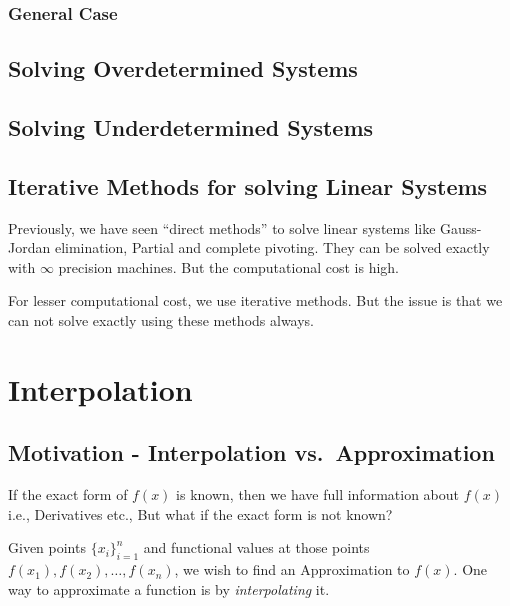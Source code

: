 \documentclass[
]{book}
\begin{document}
\hypertarget{general-case}{%
\subsection{General Case}\label{general-case}}

\hypertarget{solving-overdetermined-systems}{%
\section{Solving Overdetermined Systems}\label{solving-overdetermined-systems}}

\hypertarget{solving-underdetermined-systems}{%
\section{Solving Underdetermined Systems}\label{solving-underdetermined-systems}}

\hypertarget{iterative-methods-for-solving-linear-systems}{%
\section{Iterative Methods for solving Linear Systems}\label{iterative-methods-for-solving-linear-systems}}

Previously, we have seen ``direct methods'' to solve linear systems like Gauss-Jordan elimination, Partial and complete pivoting. They can be solved exactly with \(\infty\) precision machines. But the computational cost is high.

For lesser computational cost, we use iterative methods. But the issue is that we can not solve exactly using these methods always.

\hypertarget{interpolation}{%
\chapter{Interpolation}\label{interpolation}}

\hypertarget{motivation---interpolation-vs.-approximation}{%
\section{Motivation - Interpolation vs.~Approximation}\label{motivation---interpolation-vs.-approximation}}

If the exact form of \(f(x)\) is known, then we have full information about \(f(x)\) i.e., Derivatives etc., But what if the exact form is not known?

Given points \(\{x_i\}_{i=1}^n\) and functional values at those points \(f(x_1),f(x_2), \dots, f(x_n)\), we wish to find an Approximation to \(f(x)\). One way to approximate a function is by \emph{interpolating} it.
\end{document}
